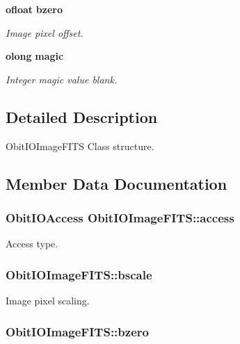 \begin{CompactItemize}
{\bf ofloat} {\bf bzero}
\begin{CompactList}\small\item\em Image pixel offset. \item\end{CompactList}\item 
{\bf olong} {\bf magic}
\begin{CompactList}\small\item\em Integer magic value blank. \item\end{CompactList}\end{CompactItemize}


\subsection{Detailed Description}
Obit\-IOImage\-FITS Class structure. 



\subsection{Member Data Documentation}
\subsubsection{\setlength{\rightskip}{0pt plus 5cm}Obit\-IOAccess {\bf Obit\-IOImage\-FITS::access}}\label{structObitIOImageFITS_o4}


Access type. 

\subsubsection{ {\bf Obit\-IOImage\-FITS::bscale}}\label{structObitIOImageFITS_o14}


Image pixel scaling. 

\subsubsection{ {\bf Obit\-IOImage\-FITS::bzero}}\label{structObitIOImageFITS_o15}


